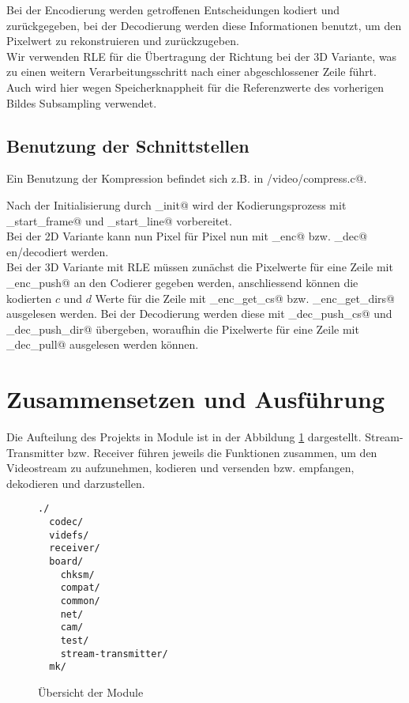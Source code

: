 Bei der Encodierung werden getroffenen Entscheidungen kodiert und zurückgegeben,
bei der Decodierung werden diese Informationen benutzt, um den Pixelwert zu rekonstruieren
und zurückzugeben. 
\\
Wir verwenden RLE für die Übertragung der Richtung bei der 3D Variante,
was zu einen weitern Verarbeitungsschritt nach einer abgeschlossener Zeile führt.
Auch wird hier wegen Speicherknappheit für die Referenzwerte des vorherigen Bildes
Subsampling verwendet.

\subsection{Benutzung der Schnittstellen}
Ein Benutzung der Kompression befindet sich z.B. in \verb@board/video/compress.c@.

Nach der Initialisierung durch \lstinline@cmpr_init@ 
wird der Kodierungsprozess mit \lstinline@cmpr_start_frame@ und
\lstinline@cmpr_start_line@ vorbereitet.
\\Bei der 2D Variante kann nun Pixel für Pixel nun mit 
\lstinline@cmpr_enc@ bzw. \lstinline@cmpr_dec@ en/decodiert werden.
\\
Bei der 3D Variante mit RLE müssen zunächst die Pixelwerte für eine Zeile mit
_enc_push@ an den Codierer gegeben werden, anschliessend 
können die kodierten $c$ und $d$ Werte für die Zeile 
mit _enc_get_cs@ bzw. _enc_get_dirs@ ausgelesen werden.
Bei der Decodierung werden diese mit _dec_push_cs@ und 
_dec_push_dir@ übergeben, woraufhin die Pixelwerte
für eine Zeile mit _dec_pull@ ausgelesen werden können.



\section{Zusammensetzen und Ausführung}

Die Aufteilung des Projekts in Module ist in der Abbildung \ref{mod} dargestellt.
Stream-Transmitter bzw. Receiver führen jeweils die Funktionen zusammen,
um den Videostream zu aufzunehmen, kodieren und versenden bzw. 
empfangen, dekodieren und darzustellen.


\begin{figure}[h]
\begin{verbatim}
./
  codec/
  videfs/
  receiver/
  board/
    chksm/
    compat/
    common/
    net/
    cam/
    test/
    stream-transmitter/
  mk/
\end{verbatim}
\caption{Übersicht der Module}
\label{mod}
\end{figure}

